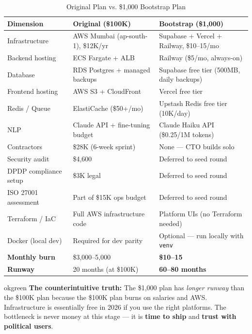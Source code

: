 \documentclass[12pt, a4paper]{article}
\begin{document}
\begin{table}[ht]
\centering
\caption{Original Plan vs. \$1,000 Bootstrap Plan}
\renewcommand{\arraystretch}{1.4}
\begin{tabularx}{\textwidth}{X p{3.5cm} p{3.5cm}}
\toprule
\rowcolor{pollitylightblue}
\textbf{Dimension} & \textbf{Original (\$100K)} & \textbf{Bootstrap (\$1,000)} \\
\midrule
Infrastructure         & AWS Mumbai (ap-south-1), \$12K/yr & Supabase + Vercel + Railway, \$10--15/mo \\
Backend hosting        & ECS Fargate + ALB                 & Railway (\$5/mo, always-on) \\
Database               & RDS Postgres + managed backups    & Supabase free tier (500MB, daily backups) \\
Frontend hosting       & AWS S3 + CloudFront               & Vercel free tier \\
Redis / Queue          & ElastiCache (\$50+/mo)            & Upstash Redis free tier (10K/day) \\
NLP                    & Claude API + fine-tuning budget   & Claude Haiku API (\$0.25/1M tokens) \\
Contractors            & \$28K (6-week sprint)             & None --- CTO builds solo \\
Security audit         & \$4,600                           & Deferred to seed round \\
DPDP compliance setup  & \$3K legal                        & Deferred to seed round \\
ISO 27001 assessment   & Part of \$15K ops budget          & Deferred to seed round \\
Terraform / IaC        & Full AWS infrastructure code      & Platform UIs (no Terraform needed) \\
Docker (local dev)     & Required for dev parity           & Optional --- run locally with \texttt{venv} \\
\midrule
\rowcolor{lightgreen}
\textbf{Monthly burn} & \$3,000--5,000 & \textbf{\$10--15} \\
\rowcolor{lightgreen}
\textbf{Runway}       & 20 months (at \$100K)  & \textbf{60--80 months} \\
\bottomrule
\end{tabularx}
\end{table}

\vspace{0.8em}

\begin{insightbox}{okgreen}
\textbf{The counterintuitive truth:} The \$1,000 plan has \textit{longer runway} than the \$100K plan
because the \$100K plan burns on salaries and AWS. Infrastructure is essentially free in 2026
if you use the right platforms. The bottleneck is never money at this stage --- it is
\textbf{time to ship} and \textbf{trust with political users}.
\end{insightbox}
\end{document}
